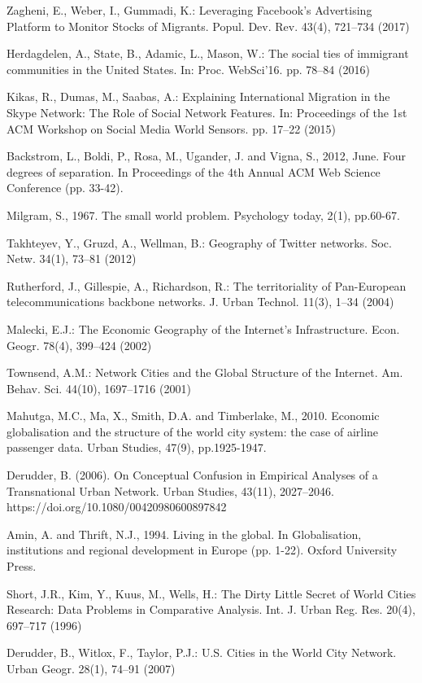 \documentclass[12pt]{article}
\begin{document}
Zagheni, E., Weber, I., Gummadi, K.: Leveraging Facebook’s Advertising Platform
to Monitor Stocks of Migrants. Popul. Dev. Rev. 43(4), 721–734 (2017)

Herdagdelen, A., State, B., Adamic, L., Mason, W.: The social ties of immigrant
communities in the United States. In: Proc. WebSci’16. pp. 78–84 (2016)

Kikas, R., Dumas, M., Saabas, A.: Explaining International Migration in the Skype
Network: The Role of Social Network Features. In: Proceedings of the 1st ACM
Workshop on Social Media World Sensors. pp. 17–22 (2015)

Backstrom, L., Boldi, P., Rosa, M., Ugander, J. and Vigna, S., 2012, June. Four degrees of separation. In Proceedings of the 4th Annual ACM Web Science Conference (pp. 33-42).

Milgram, S., 1967. The small world problem. Psychology today, 2(1), pp.60-67.

Takhteyev, Y., Gruzd, A., Wellman, B.: Geography of Twitter networks. Soc. Netw.
34(1), 73–81 (2012)

Rutherford, J., Gillespie, A., Richardson, R.: The territoriality of Pan-European
telecommunications backbone networks. J. Urban Technol. 11(3), 1–34 (2004)

Malecki, E.J.: The Economic Geography of the Internet’s Infrastructure. Econ.
Geogr. 78(4), 399–424 (2002)

Townsend, A.M.: Network Cities and the Global Structure of the Internet. Am.
Behav. Sci. 44(10), 1697–1716 (2001)

Mahutga, M.C., Ma, X., Smith, D.A. and Timberlake, M., 2010. Economic globalisation and the structure of the world city system: the case of airline passenger data. Urban Studies, 47(9), pp.1925-1947.

Derudder, B. (2006). On Conceptual Confusion in Empirical Analyses of a Transnational Urban Network. Urban Studies, 43(11), 2027–2046. https://doi.org/10.1080/00420980600897842

Amin, A. and Thrift, N.J., 1994. Living in the global. In Globalisation, institutions and regional development in Europe (pp. 1-22). Oxford University Press.

Short, J.R., Kim, Y., Kuus, M., Wells, H.: The Dirty Little Secret of World Cities
Research: Data Problems in Comparative Analysis. Int. J. Urban Reg. Res. 20(4),
697–717 (1996)

Derudder, B., Witlox, F., Taylor, P.J.: U.S. Cities in the World City Network.
Urban Geogr. 28(1), 74–91 (2007)
\end{document}
